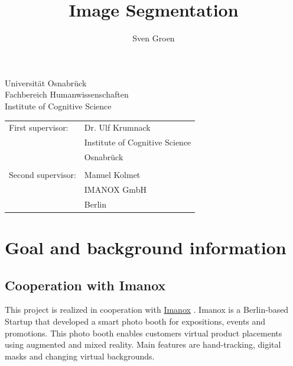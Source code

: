 \documentclass[11pt,
  paper=a4, 
  bibliography=totocnumbered,
	captions=tableheading,
	BCOR=10mm
]{scrreprt}
\title{Image Segmentation}
\author{Sven Groen}
\theoremstyle{definition}
\begin{document}
\begin{titlepage}
	\begin{flushleft}
		Universität Osnabrück\\
		Fachbereich Humanwissenschaften\\
		Institute of Cognitive Science
	\end{flushleft}

	\vspace{2cm}
	\vspace{1cm}

	\begin{tabular}{ll}
		First supervisor:  & Dr. Ulf Krumnack          \\
		                   & Institute of Cognitive Science            \\
		                   & Osnabrück                \\\\
		Second supervisor: & Manuel Kolmet         \\
		                   & IMANOX GmbH  \\
		                   & Berlin 
	\end{tabular}

\end{titlepage}


\pagebreak


\tableofcontents


\chapter{Goal and background information}

\section{Cooperation with Imanox}
This project is realized in cooperation with \href{https://www.imanox.de/}{Imanox} . 
Imanox is a Berlin-based Startup that developed a smart photo booth for expositions, events and promotions. 
This photo booth enables customers virtual product placements using augmented and mixed reality. 
Main features are hand-tracking, digital masks and changing virtual backgrounds.
\end{document}
